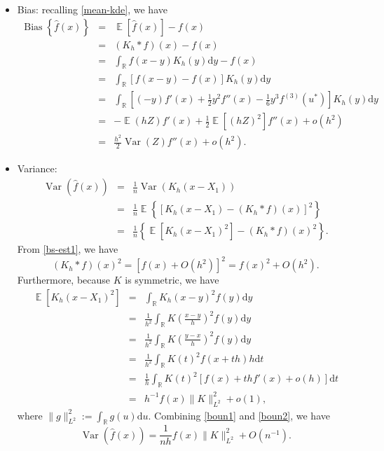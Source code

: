 \documentclass[19pt,landscape]{article}
\DeclareMathOperator{\E}{\mathbb{E}}
\newcommand{\R}{\mathbb{R}}
\DeclareMathOperator{\var}{\mathrm{Var}}
\DeclareMathOperator{\bs}{\mathrm{Bias}}
\begin{document}
    \begin{itemize}
        \item Bias: recalling \eqref{mean-kde}, we have 
        \begin{eqnarray}
            \bs\left\{\hat{f}(x)\right\}&=&\E\left[\hat{f}(x)\right]-f(x)\nonumber\\
            &=&(K_h*f)(x)-f(x)\nonumber\\
            &=&\int_{\R}f(x-y)K_h(y)\mathrm{d}y-f(x)\nonumber\\
            &=&\int_{\R}[f(x-y)-f(x)]K_h(y)\mathrm{d}y\nonumber\\
            &=&\int_{\R}\left[(-y)f'(x)+\frac12y^2f''(x)-\frac16y^3f^{(3)}(u^*)\right]K_h(y)\mathrm{d}y\label{taylor-1}\\
            &=&-\E(hZ)f'(x)+\frac12\E[(hZ)^2]f''(x)+o(h^2)\nonumber\\
            &=&\frac{h^2}2\var(Z)f''(x)+o(h^2).\label{bs-est1}
        \end{eqnarray}
        \item Variance:
        \begin{eqnarray}
            \var\left(\hat{f}(x)\right)&=&\frac1n\var\left(K_h(x-X_1)\right)\nonumber\\
            &=&\frac1n\E\left\{[K_h(x-X_1)-(K_h*f)(x)]^2\right\}\nonumber\\
            &=&\frac1n\left\{\E\left[K_h(x-X_1)^2\right]-(K_h*f)(x)^2\right\}.
        \end{eqnarray}
        From \eqref{bs-est1}, we have 
        \begin{equation}\label{boun1}
            (K_h*f)(x)^2=\left[f(x)+O(h^2)\right]^2=f(x)^2+O(h^2).
        \end{equation}
        Furthermore, because $K$ is symmetric, we have 
        \begin{eqnarray}
            \E\left[K_h(x-X_1)^2\right]&=&\int_{\R}K_h(x-y)^2f(y)\mathrm{d}y\nonumber\\
            &=&\frac1{h^2}\int_{\R}K\left(\frac{x-y}h\right)^2f(y)\mathrm{d}y\\
            &=&\frac1{h^2}\int_{\R}K\left(\frac{y-x}h\right)^2f(y)\mathrm{d}y\\
            &=&\frac1{h^2}\int_{\R}K(t)^2f(x+th)h\mathrm{d}t\nonumber\\
            &=&\frac1h\int_{\R}K(t)^2[f(x)+thf'(x)+o(h)]\mathrm{d}t\\
            &=&h^{-1}f(x)\|K\|_{L^2}^2+o(1),\label{boun2}
        \end{eqnarray}
        where $\|g\|_{L^2}^2:=\int_{\R}g(u)\mathrm{d}u$. 
        Combining \eqref{boun1} and \eqref{boun2}, we have 
        \begin{equation}
            \var\left(\hat{f}(x)\right)=\frac1{nh}f(x)\|K\|_{L^2}^2+O(n^{-1}).
        \end{equation}


\end{itemize}
\end{document}
